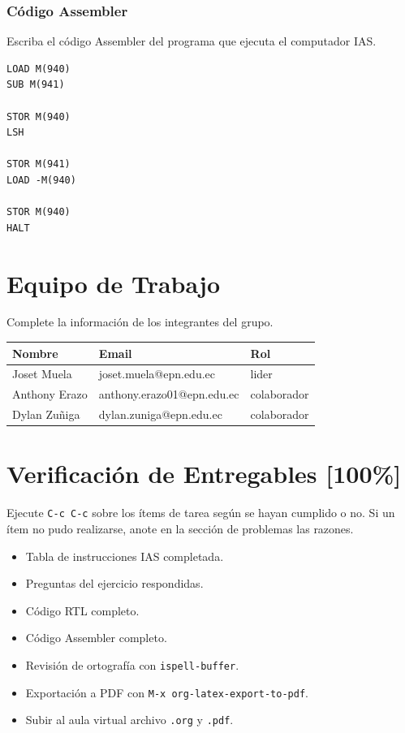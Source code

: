 \documentclass{article}
\begin{document}
\subsubsection{Código Assembler}
\label{sec:org025bbbc}

Escriba el código Assembler del programa que ejecuta el computador IAS.

\begin{verbatim}
LOAD M(940)
SUB M(941)

STOR M(940)
LSH

STOR M(941)
LOAD -M(940)

STOR M(940)
HALT

\end{verbatim}

\section{Equipo de Trabajo}
\label{sec:orgf509056}

Complete la información de los integrantes del grupo.

\begin{center}
\begin{tabular}{lll}
\hline
Nombre & Email & Rol\\[0pt]
\hline
Joset Muela & joset.muela@epn.edu.ec & lider\\[0pt]
Anthony Erazo & anthony.erazo01@epn.edu.ec & colaborador\\[0pt]
Dylan Zuñiga & dylan.zuniga@epn.edu.ec & colaborador\\[0pt]
\hline
\end{tabular}
\end{center}

\section{Verificación de Entregables [100\%]}
\label{sec:orgf01c362}

Ejecute \texttt{C-c C-c} sobre los ítems de tarea según se hayan cumplido o
no. Si un ítem no pudo realizarse, anote en la sección de problemas
las razones.

\begin{itemize}
\item[{$\boxtimes$}] Tabla de instrucciones IAS completada.
\item[{$\boxtimes$}] Preguntas del ejercicio respondidas.
\item[{$\boxtimes$}] Código RTL completo.
\item[{$\boxtimes$}] Código Assembler completo.
\item[{$\boxtimes$}] Revisión de ortografía con \texttt{ispell-buffer}.
\item[{$\boxtimes$}] Exportación a PDF con \texttt{M-x org-latex-export-to-pdf}.
\item[{$\boxtimes$}] Subir al aula virtual archivo \texttt{.org} y \texttt{.pdf}.
\end{itemize}
\end{document}
